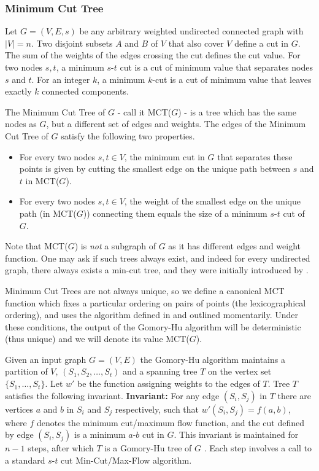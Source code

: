 \documentclass[twoside,11pt]{article}
\begin{document}
\subsubsection{Minimum Cut Tree}
\label{mctdesc}
Let $G=(V, E,s)$ be any arbitrary weighted undirected connected graph with $|V|=n$.
Two disjoint subsets $A$ and $B$ of $V$ that also cover $V$ define a cut
in $G$. The sum of the weights of the edges crossing the cut defines the cut value. For two nodes $s,t$, a minimum $s$-$t$ cut is a cut of minimum value that separates nodes $s$ and $t$. For an integer $k$, a minimum $k$-cut is a cut of minimum value that  leaves exactly $k$ connected components.

The Minimum Cut Tree of $G$ - call it MCT($G$) - is a tree which has the same nodes as $G$, but a different set of edges and weights. The edges of the Minimum Cut
Tree of $G$ satisfy the following two properties.

\begin{itemize}
	\item For every two nodes $s, t \in V$, the minimum cut in $G$ that separates these points is given by cutting the smallest edge on the unique path between $s$ and $t$ in MCT($G$).
	\item For every two nodes $s, t \in V$, the weight of the smallest edge on the unique path (in MCT($G$)) connecting them equals the size of a minimum $s$-$t$ cut of $G$.
\end{itemize}

Note that MCT($G$) is \textit{not} a subgraph of $G$ as it has different edges and weight function. One may ask if such trees always exist, and indeed for every undirected graph, there always exists a min-cut tree, and they were initially introduced by \cite{gomoryhu}.

Minimum Cut Trees are not always unique, so we define a canonical MCT function which fixes a particular
ordering on pairs of points (the lexicographical ordering), and uses the algorithm defined in \citep{gomoryhu} and outlined momentarily. Under these conditions, the output of the Gomory-Hu algorithm will be deterministic (thus unique) and we will denote its value MCT($G$).

Given an input graph $G = (V, E)$ the Gomory-Hu algorithm maintains a partition of $V$, $(S_1, S_2, \ldots, S_t)$ and a spanning tree $T$ on the vertex set
$\{S_1, \ldots, S_t\}$. Let $w'$ be the function assigning weights to the edges of $T$. Tree $T$ satisfies the following invariant. \textbf{Invariant:} For any edge $(S_i, S_j)$ in $T$ there are vertices $a$ and $b$ in $S_i$ and $S_j$ respectively, such that $w'(S_i, S_j) = f(a, b)$, where $f$ denotes the minimum cut/maximum flow function, and the cut defined by edge $(S_i, S_j)$ is a minimum $a$-$b$ cut in $G$. This invariant is maintained for $n-1$ steps, after which $T$ is a Gomory-Hu tree of $G$ \citep{vaziranibook}. Each step involves a call to a standard $s\text{-}t$ cut Min-Cut/Max-Flow algorithm.
\end{document}
